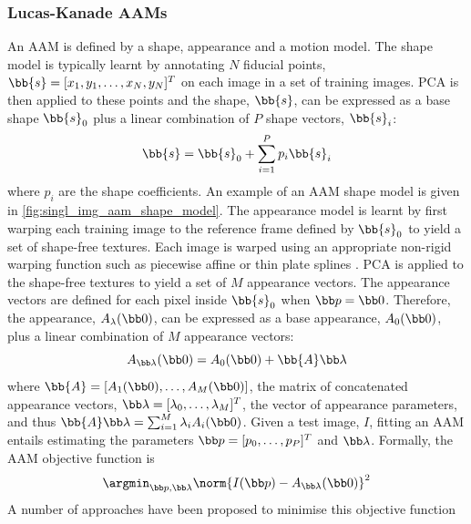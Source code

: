 \subsubsection{Lucas-Kanade AAMs}\label{subsubsec:2d-lk-aams}
An AAM is defined by a shape, appearance and a motion model. The shape model is
typically learnt by annotating $N$ fiducial points, $\bb{s} = [x_1, y_1,
\ldots, x_N, y_N]^T$ on each image in a set of training images. PCA is then
applied to these points and the shape, $\bb{s}$, can be expressed as a
base shape $\bb{s}_0$ plus a linear combination of $P$ shape vectors,
$\bb{s}_i$:
\begin{equation}\label{eq:aam-shape-model}
    \bb{s} = \bb{s}_0 + \sum^P_{i=1} p_i \bb{s}_i
\end{equation}
where $p_i$ are the shape coefficients.
An example of an AAM shape model is given in \cref{fig:singl_img_aam_shape_model}.
The appearance model is learnt by first
warping each training image to the reference frame defined by $\bb{s}_0$
to yield a set of shape-free textures. Each image is warped using an appropriate
non-rigid warping function such as piecewise affine \cite{cootes2001active} or thin
plate splines \cite{papandreou2008adaptive}. PCA is applied to the shape-free textures to
yield a set of $M$ appearance vectors. The appearance vectors are defined for
each pixel inside $\bb{s}_0$ when $\p = \zero$. Therefore, the
appearance, $A_\lambda(\zero)$, can be expressed as a base appearance,
$A_0(\zero)$, plus a linear combination of $M$ appearance vectors:
\begin{equation}\label{eq:aam-appearance-model}
    A_{\blambda}(\zero) = A_0(\zero) + \bb{A} \blambda
\end{equation}
where $\bb{A} = [A_1(\zero), \ldots, A_M(\zero)]$, the matrix of
concatenated appearance vectors, $\blambda = [\lambda_0, \ldots, \lambda_M]^T$,
the vector of appearance parameters, and thus $\bb{A} \blambda =
\sum^M_{i=1} \lambda_i A_i(\zero)$. Given a test image, $I$, fitting an AAM
entails estimating the parameters $\p = [p_0, \ldots, p_P]^T$ and $\blambda$.
Formally, the AAM objective function is
\begin{equation}\label{eq:aam-objective}
    \argmin_{\p,\blambda} \norm{I(\p) - A_{\blambda}(\zero)}^2
\end{equation}
A number of approaches have been proposed to minimise this objective function
